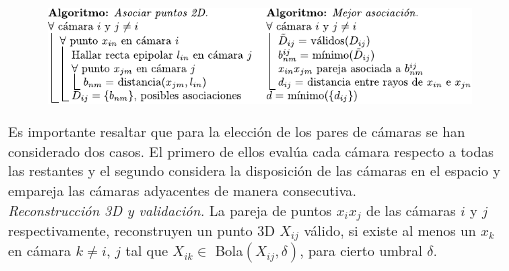 \vspace{-0.65cm}
\begin{figure}
    \begin{center}
       \includegraphics[scale=1.0]{./imagenes/Reconstruccion/Algoritmo_reconstruccion}       
    \end{center}
\end{figure}
\vspace{-1.0cm}
Es importante resaltar que para la elección de los pares de cámaras se han considerado dos casos.
El primero de ellos evalúa cada cámara respecto a todas las restantes y el segundo considera la disposición de las cámaras en el espacio y empareja las cámaras adyacentes de manera consecutiva.\\
%
\textit{Reconstrucción 3D y validación.}\label{seccion_reconstruccion3D_validacion}
La pareja de puntos $x_i x_j$ de las cámaras $i$ y $j$ respectivamente, reconstruyen un punto 3D $X_{ij}$ válido, si existe al menos un $x_k$ en cámara $k\not= i, \,j$ tal que $X_{ik} \in $ Bola$(X_{ij}, \delta)$, para cierto umbral $\delta$.\\
%
